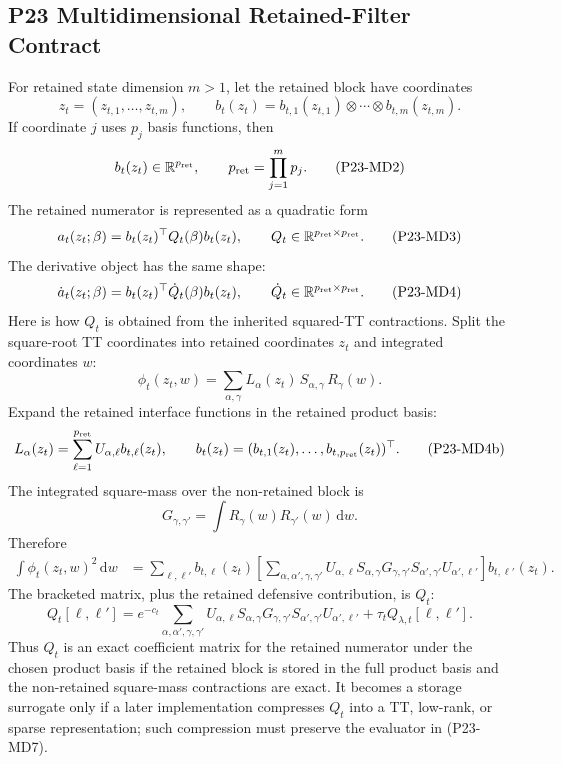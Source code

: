 \documentclass[11pt]{article}
\newcommand{\R}{\mathbb R}
\newcommand{\dd}{\,\mathrm d}
\begin{document}
\subsection*{P23 Multidimensional Retained-Filter Contract}

For retained state dimension \(m>1\), let the retained block have coordinates
\[
    z_t=(z_{t,1},\ldots,z_{t,m}),
    \qquad
    b_t(z_t)=b_{t,1}(z_{t,1})\otimes\cdots\otimes b_{t,m}(z_{t,m}).
    \tag{P23-MD1}
\]
If coordinate \(j\) uses \(p_j\) basis functions, then
\[
    b_t(z_t)\in\R^{p_{\rm ret}},
    \qquad
    p_{\rm ret}=\prod_{j=1}^m p_j.
    \tag{P23-MD2}
\]
The retained numerator is represented as a quadratic form
\[
    a_t(z_t;\beta)
    =
    b_t(z_t)^\top Q_t(\beta)b_t(z_t),
    \qquad
    Q_t\in\R^{p_{\rm ret}\times p_{\rm ret}}.
    \tag{P23-MD3}
\]
The derivative object has the same shape:
\[
    \dot a_t(z_t;\beta)
    =
    b_t(z_t)^\top \dot Q_t(\beta)b_t(z_t),
    \qquad
    \dot Q_t\in\R^{p_{\rm ret}\times p_{\rm ret}}.
    \tag{P23-MD4}
\]
Here is how \(Q_t\) is obtained from the inherited squared-TT contractions.
Split the square-root TT coordinates into retained coordinates \(z_t\) and
integrated coordinates \(w\):
\[
    \phi_t(z_t,w)
    =
    \sum_{\alpha,\gamma}
    L_\alpha(z_t)\,S_{\alpha,\gamma}\,R_\gamma(w).
    \tag{P23-MD4a}
\]
Expand the retained interface functions in the retained product basis:
\[
    L_\alpha(z_t)
    =
    \sum_{\ell=1}^{p_{\rm ret}} U_{\alpha,\ell}b_{t,\ell}(z_t),
    \qquad
    b_t(z_t)=(b_{t,1}(z_t),\ldots,b_{t,p_{\rm ret}}(z_t))^\top.
    \tag{P23-MD4b}
\]
The integrated square-mass over the non-retained block is
\[
    G_{\gamma,\gamma'}
    =
    \int R_\gamma(w)R_{\gamma'}(w)\dd w.
    \tag{P23-MD4c}
\]
Therefore
\[
\begin{aligned}
    \int\phi_t(z_t,w)^2\dd w
    &=
    \sum_{\ell,\ell'}
    b_{t,\ell}(z_t)
    \left[
    \sum_{\alpha,\alpha',\gamma,\gamma'}
    U_{\alpha,\ell}S_{\alpha,\gamma}
    G_{\gamma,\gamma'}
    S_{\alpha',\gamma'}U_{\alpha',\ell'}
    \right]
    b_{t,\ell'}(z_t).
\end{aligned}
    \tag{P23-MD4d}
\]
The bracketed matrix, plus the retained defensive contribution, is \(Q_t\):
\[
    Q_t[\ell,\ell']
    =
    e^{-c_t}
    \sum_{\alpha,\alpha',\gamma,\gamma'}
    U_{\alpha,\ell}S_{\alpha,\gamma}
    G_{\gamma,\gamma'}
    S_{\alpha',\gamma'}U_{\alpha',\ell'}
    +
    \tau_t Q_{\lambda,t}[\ell,\ell'].
    \tag{P23-MD4e}
\]
Thus \(Q_t\) is an exact coefficient matrix for the retained numerator under
the chosen product basis if the retained block is stored in the full product
basis and the non-retained square-mass contractions are exact.  It becomes a
storage surrogate only if a later implementation compresses \(Q_t\) into a TT,
low-rank, or sparse representation; such compression must preserve the
evaluator in (P23-MD7).
\end{document}

